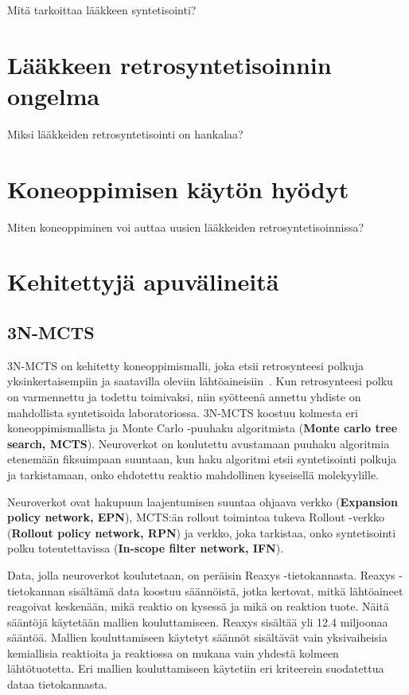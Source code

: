 \documentclass[finnish,twoside,censored,subject,sw-line]{HYthesisML}
\begin{document}
Mitä tarkoittaa lääkkeen syntetisointi?~\cite{deAlmeidaA.Filipa2019Socd}

\chapter{Lääkkeen retrosyntetisoinnin ongelma}

Miksi lääkkeiden retrosyntetisointi on hankalaa?~\cite{ButlerKeithT2018Mlfm,deAlmeidaA.Filipa2019Socd}

\chapter{Koneoppimisen käytön hyödyt}

Miten koneoppiminen voi auttaa uusien lääkkeiden retrosyntetisoinnissa?~\cite{VamathevanJessica2019Aoml}

\chapter{Kehitettyjä apuvälineitä}

\section{3N-MCTS}

3N-MCTS on kehitetty koneoppimismalli, joka etsii retrosynteesi polkuja yksinkertaisempiin
ja saatavilla oleviin lähtöaineisiin~\cite{SeglerMarwinHS2018Pcsw}. Kun retrosynteesi polku on varmennettu ja
todettu toimivaksi, niin syötteenä annettu yhdiste on mahdollista syntetisoida laboratoriossa.
3N-MCTS koostuu kolmesta eri koneoppimismallista ja Monte Carlo -puuhaku algoritmista
(\textbf{Monte carlo tree search, MCTS}). Neuroverkot on koulutettu avustamaan puuhaku algoritmia etenemään
fiksuimpaan suuntaan, kun haku algoritmi etsii syntetisointi polkuja ja tarkistamaan, onko ehdotettu reaktio
mahdollinen kyseisellä molekyylille.

Neuroverkot ovat hakupuun laajentumisen suuntaa ohjaava verkko (\textbf{Expansion policy network, EPN}),
MCTS:än rollout toimintoa tukeva Rollout -verkko (\textbf{Rollout policy network, RPN})
ja verkko, joka tarkistaa, onko syntetisointi polku toteutettavissa (\textbf{In-scope filter network, IFN}).

Data, jolla neuroverkot koulutetaan, on peräisin Reaxys -tietokannasta. Reaxys -tietokannan sisältämä data koostuu
säännöistä, jotka kertovat, mitkä lähtöaineet reagoivat keskenään, mikä reaktio on kysessä ja mikä on reaktion
tuote. Näitä sääntöjä käytetään mallien kouluttamiseen. Reaxys sisältää yli 12.4 miljoonaa sääntöä. Mallien
kouluttamiseen käytetyt säännöt sisältävät vain yksivaiheisia kemiallisia reaktioita ja reaktiossa on mukana vain
yhdestä kolmeen lähtötuotetta. Eri mallien kouluttamiseen käytetiin eri kriteerein suodatettua dataa tietokannasta.
\end{document}
